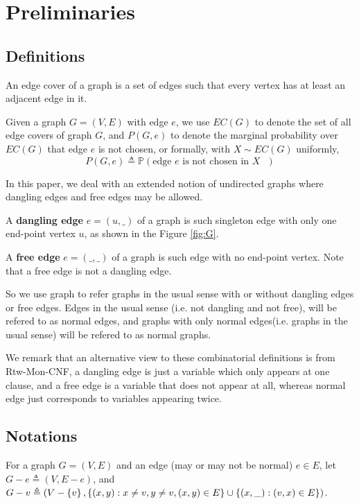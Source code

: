 
\section{Preliminaries}
\subsection{Definitions}
An edge cover of a graph is a set of edges such that every vertex has at least an adjacent edge in it.

Given a graph $G=(V,E)$ with edge $e$,  we use $EC(G)$ to denote the set of all edge covers of graph $G$, and $P(G, e)$ to denote the marginal probability over $EC(G)$ that edge $e$ is not chosen, or formally, with $X \sim EC(G)$ uniformly,
\begin{equation}
	P(G, e) \triangleq \mathbb{P} \left(\textrm{edge $e$ is not chosen in $X$ } \right)
	\label{defpge}
\end{equation}

In this paper, we deal with an extended notion of undirected graphs where dangling edges and free edges may be allowed.
\begin{Def}
	A {\bf dangling edge} $e=(u,\_)$ of a graph is such singleton edge with only one end-point vertex $u$, as shown in the Figure \ref{fig:G}.

	A {\bf free edge} $e=(\_, \_)$ of a graph is such edge with no end-point vertex. Note that a free edge is not a dangling edge.

%

\end{Def}

	So we use graph to refer graphs in the usual sense with or without dangling edges or free edges.
	Edges in the usual sense (i.e. not dangling and not free), will be refered to as normal edges, 
	and graphs with only normal edges(i.e. graphs in the usual sense) will be refered to as normal graphs.

	We remark that an alternative view to these combinatorial definitions is from Rtw-Mon-CNF,
	a dangling edge is just a variable which only appears at one clause, and a free edge is a variable
	that does not appear at all, whereas normal edge just corresponds to variables appearing twice.

\subsection{Notations}
For a graph $G=(V,E)$ and an edge (may or may not be normal) $e \in E$, let $G-e \triangleq (V, E-e)$, and $G-v \triangleq (V-\left\{v\right\}, \left\{(x,y):x\neq v, y\neq v, (x,y) \in E\right\} \cup \left\{(x,\_):(v,x) \in E\right\})$.

